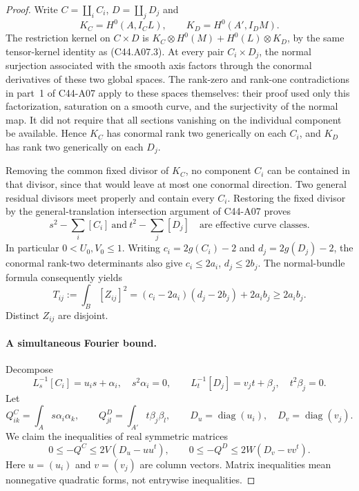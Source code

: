 \documentclass[11pt]{article}
\theoremstyle{remark}\newtheorem{remark}[theorem]{Remark}
\begin{document}
\begin{proof}
Write $C=\coprod_iC_i$, $D=\coprod_jD_j$ and
\[
 K_C=H^0(A,I_CL),\qquad K_D=H^0(A',I_DM).
\]
The restriction kernel on $C\times D$ is
$K_C\otimes H^0(M)+H^0(L)\otimes K_D$, by the same tensor-kernel
identity as (C44.A07.3). At every pair $C_i\times D_j$, the
normal surjection associated with the smooth axis factors
through the conormal derivatives of these two global spaces.
The rank-zero and rank-one contradictions in part~1 of C44-A07
apply to these spaces themselves: their proof used only this
factorization, saturation on a smooth curve, and the surjectivity
of the normal map. It did not require that all sections vanishing
on the individual component be available. Hence $K_C$ has
conormal rank two generically on each $C_i$, and $K_D$ has rank
two generically on each $D_j$.

Removing the common fixed divisor of $K_C$, no component $C_i$
can be contained in that divisor, since that would leave at most
one conormal direction. Two general residual divisors meet
properly and contain every $C_i$. Restoring the fixed divisor
by the general-translation intersection argument of C44-A07
proves
\[
          s^2-\sum_i[C_i]\ \text{and}\
          t^2-\sum_j[D_j]\quad\text{are effective curve classes}.
 \tag{C44.A09.3}
\]
In particular $0<U_0,V_0\le1$.
Writing $c_i=2g(C_i)-2$ and $d_j=2g(D_j)-2$, the conormal
rank-two determinants also give $c_i\le2a_i$, $d_j\le2b_j$.
The normal-bundle formula consequently yields
\[
 T_{ij}:=\int_B[Z_{ij}]^2
       =(c_i-2a_i)(d_j-2b_j)+2a_ib_j\ge2a_ib_j.
 \tag{C44.A09.4}
\]
Distinct $Z_{ij}$ are disjoint.

\paragraph{A simultaneous Fourier bound.}
Decompose
\[
 L_s^{-1}[C_i]=u_is+\alpha_i,\quad s^2\alpha_i=0,
 \qquad
 L_t^{-1}[D_j]=v_jt+\beta_j,\quad t^2\beta_j=0.
\]
Let
\[
 Q^C_{ik}=\int_As\alpha_i\alpha_k,\qquad
 Q^D_{jl}=\int_{A'}t\beta_j\beta_l,
 \qquad D_u=\operatorname{diag}(u_i),\quad
 D_v=\operatorname{diag}(v_j).
\]
We claim the inequalities of real symmetric matrices
\[
 0\le -Q^C\le2V(D_u-uu^t),\qquad
 0\le -Q^D\le2W(D_v-vv^t).
 \tag{C44.A09.5}
\]
Here $u=(u_i)$ and $v=(v_j)$ are column vectors. Matrix
inequalities mean nonnegative quadratic forms, not entrywise
inequalities.


\end{proof}
\end{document}
